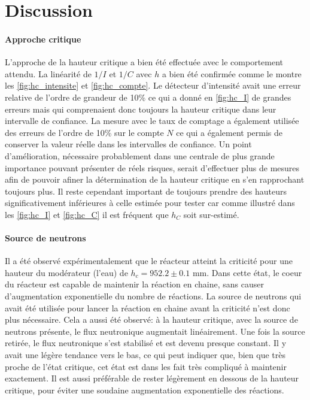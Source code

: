 \section{Discussion}

\paragraph{Approche critique}
L'approche de la hauteur critique a bien été effectuée avec le comportement attendu. La linéarité de $1/I$ et $1/C$ avec $h$ a bien été confirmée comme le montre les \autoref{fig:hc_intensite} et \autoref{fig:hc_compte}. Le détecteur d'intensité avait une erreur relative de l'ordre de grandeur de 10\% ce qui a donné en \autoref{fig:hc_I} de grandes erreurs mais qui comprenaient donc toujours la hauteur critique dans leur intervalle de confiance. La mesure avec le taux de comptage a également utilisée des erreurs de l'ordre de 10\% sur le compte $N$ ce qui a également permis de conserver la valeur réelle dans les intervalles de confiance. Un point d'amélioration, nécessaire probablement dans une centrale de plus grande importance pouvant présenter de réels risques, serait d'effectuer plus de mesures afin de pouvoir afiner la détermination de la hauteur critique en s'en rapprochant toujours plus. Il reste cependant important de toujours prendre des hauteurs significativement inférieures à celle estimée pour tester car comme illustré dans les \autoref{fig:hc_I} et \autoref{fig:hc_C} il est fréquent que $h_C$ soit sur-estimé.

\paragraph{Source de neutrons}
Il a été observé expérimentalement que le réacteur atteint la criticité pour une hauteur du modérateur (l'eau) de \(h_c = 952.2 \pm 0.1\) mm. Dans cette état, le coeur du réacteur est capable de maintenir la réaction en chaine, sans causer d'augmentation exponentielle du nombre de réactions. La source de neutrons qui avait été utilisée pour lancer la réaction en chaine avant la criticité n'est donc plus nécessaire. Cela a aussi été observé: à la hauteur critique, avec la source de neutrons présente, le flux neutronique augmentait linéairement. Une fois la source retirée, le flux neutronique s'est stabilisé et est devenu presque constant. Il y avait une légère tendance vers le bas, ce qui peut indiquer que, bien que très proche de l'état critique, cet état est dans les fait très compliqué à maintenir exactement. Il est aussi préférable de rester légèrement en dessous de la hauteur critique, pour éviter une soudaine augmentation exponentielle des réactions.

